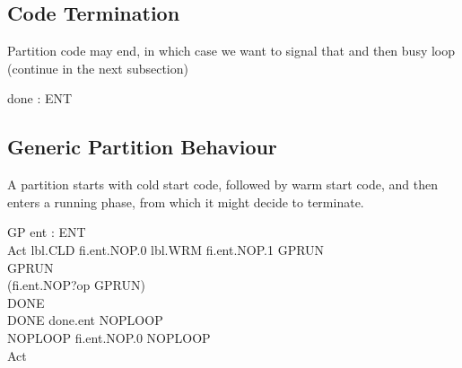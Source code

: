 \subsection{Code Termination} %
Partition code may end,
in which case we want to signal that and then busy loop (continue in the next subsection)
\begin{circus}
\circchannel done : ENT
\end{circus}


\subsection{Generic Partition Behaviour} %

A partition starts with cold start code, followed by warm start code,
and then enters a running phase, from which it might decide to terminate.

\begin{circus}
\circprocess GP \circdef ent : ENT \circspot \circbegin\\
  Act \circdef lbl.CLD \then  fi.ent.NOP.0 \then  lbl.WRM \then  fi.ent.NOP.1 \then  GPRUN\\
GPRUN\circdef\\
  (fi.ent.NOP?op \then  GPRUN)\\
   \intchoice DONE\\
   DONE \circdef done.ent \then  NOPLOOP\\
   NOPLOOP \circdef fi.ent.NOP.0 \then  NOPLOOP   \\
   \circspot Act\\
\circend

\end{circus}
